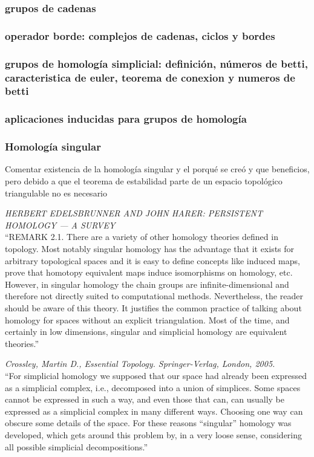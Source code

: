 \subsubsection*{grupos de cadenas}
\subsubsection*{operador borde: complejos de cadenas, ciclos y bordes}
\subsubsection*{grupos de homología simplicial: definición, números de betti, caracteristica de euler, teorema de conexion y numeros de betti}
\subsubsection*{aplicaciones inducidas para grupos de homología}

\subsubsection*{Homología singular}
Comentar existencia de la homología singular y el porqué se creó y que beneficios, pero debido a que el teorema de estabilidad parte de un espacio topológico triangulable no es necesario


\textit{HERBERT EDELSBRUNNER AND JOHN HARER: PERSISTENT HOMOLOGY — A SURVEY\\}
``REMARK 2.1. There are a variety of other homology theories defined in topology.
Most notably singular homology has the advantage that it exists for arbitrary topological
spaces and it is easy to define concepts like induced maps, prove that homotopy equivalent
maps induce isomorphisms on homology, etc. However, in singular homology the chain
groups are infinite-dimensional and therefore not directly suited to computational methods.
Nevertheless, the reader should be aware of this theory. It justifies the common practice of
talking about homology for spaces without an explicit triangulation. Most of the time, and
certainly in low dimensions, singular and simplicial homology are equivalent theories.''

\textit{Crossley, Martin D., Essential Topology. Springer-Verlag, London, 2005.\\}
``For simplicial homology we supposed that our space had already been expressed as a simplicial complex, i.e., decomposed into a union of simplices. Some spaces cannot be expressed in such a way, and even those that can, can usually be expressed as a simplicial complex in many different ways. Choosing one way can obscure some details of the space. For these reasons “singular” homology was developed, which gets around this problem by, in a very loose sense, considering all possible simplicial decompositions.''

